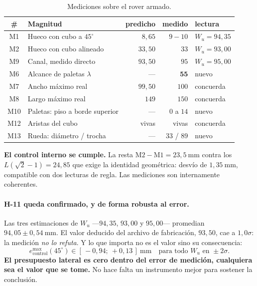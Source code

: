\documentclass[11pt,a4paper]{article}
\newcommand{\grados}{^{\circ}}
\begin{document}
\begin{table}[htbp]
\centering
\small
\caption{Mediciones sobre el rover armado.}
\begin{tabular}{clrrl}
\toprule
\# & Magnitud & predicho & medido & lectura \\
\midrule
M1  & Hueco con cubo a $45\grados$ & $8{,}65$ & $9{-}10$ & $W_u = 94{,}35$ \\
M2  & Hueco con cubo alineado & $33{,}50$ & $33$ & $W_u = 93{,}00$ \\
M9  & Canal, medido directo & $93{,}50$ & $95$ & $W_u = 95{,}00$ \\
\midrule
M6  & Alcance de paletas $\lambda$ & --- & $\mathbf{55}$ & nuevo \\
M7  & Ancho máximo real & $99{,}50$ & $100$ & concuerda \\
M8  & Largo máximo real & $149$ & $150$ & concuerda \\
M10 & Paletas: piso a borde superior & --- & $0$ a $14$ & nuevo \\
M12 & Aristas del cubo & vivas & vivas & concuerda \\
M13 & Rueda: diámetro / trocha & --- & $33$ / $89$ & nuevo \\
\bottomrule
\end{tabular}
\end{table}

\begin{tcolorbox}[colback=black!3,colframe=black!50,boxrule=0.5pt,arc=1pt]
\textbf{El control interno se cumple.} La resta $\text{M2}-\text{M1} = 23{,}5\ \mathrm{mm}$
contra los $L(\sqrt2-1) = 24{,}85$ que exige la identidad geométrica: desvío de
$1{,}35\ \mathrm{mm}$, compatible con dos lecturas de regla. Las mediciones son
internamente coherentes.
\end{tcolorbox}

\paragraph{H-11 queda confirmado, y de forma robusta al error.} Las tres estimaciones de
$W_u$ ---$94{,}35$, $93{,}00$ y $95{,}00$--- promedian $94{,}05 \pm 0{,}54\ \mathrm{mm}$.
El valor deducido del archivo de fabricación, $93{,}50$, cae a $1{,}0\sigma$: la medición
\emph{no lo refuta}. Y lo que importa no es el valor sino su consecuencia:
\[
  e^{\max}_{\mathrm{control}}(45\grados) \in [\,-0{,}94;\ +0{,}13\,]\ \mathrm{mm}
  \quad \text{para todo } W_u \text{ en } \pm2\sigma .
\]
\textbf{El presupuesto lateral es cero dentro del error de medición, cualquiera sea el
valor que se tome.} No hace falta un instrumento mejor para sostener la conclusión.
\end{document}
